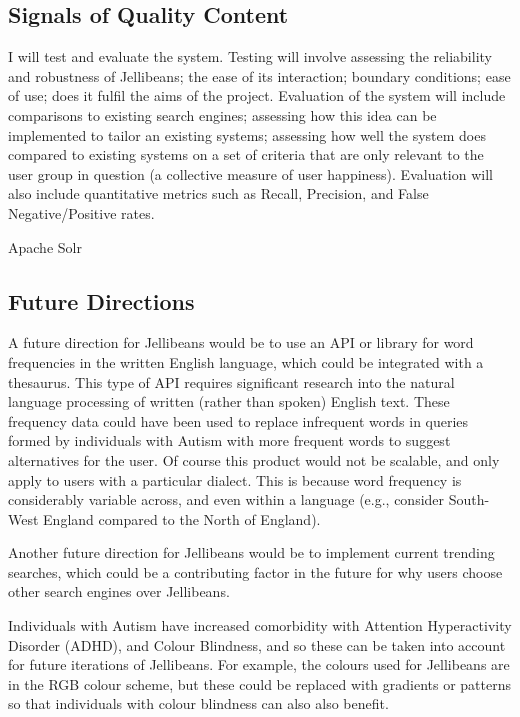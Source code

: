 \documentclass[a4paper, 11pt]{article}
\begin{document}
\subsection{Signals of Quality Content}
I will test and evaluate the system. Testing will involve assessing the reliability and robustness of Jellibeans; the ease of its interaction; boundary conditions; ease of use; does it fulfil the aims of the project.
Evaluation of the system will include comparisons to existing search engines; assessing how this idea can be implemented to tailor an existing systems; assessing how well the system does compared to existing systems on a set of criteria that are only relevant to the user group in question (a collective measure of user happiness). Evaluation will also include quantitative metrics such as Recall, Precision, and False Negative/Positive rates.


Apache Solr\\


\subsection{Future Directions}
A future direction for Jellibeans would be to use an API or library for word frequencies in the written English language, which could be integrated with a thesaurus. This type of API requires significant research into the natural language processing of written (rather than spoken) English text. These frequency data could have been used to replace infrequent words in queries formed by individuals with Autism with more frequent words to suggest alternatives for the user. Of course this product would not be scalable, and only apply to users with a particular dialect. This is because word frequency is considerably variable across, and even within a language (e.g., consider South-West England compared to the North of England).

\vspace{5mm}
Another future direction for Jellibeans would be to implement current trending searches, which could be a contributing factor in the future for why users choose other search engines over Jellibeans. 

\vspace{5mm}
Individuals with Autism have increased comorbidity with Attention Hyperactivity Disorder (ADHD), and Colour Blindness, and so these can be taken into account for future iterations of Jellibeans. For example, the colours used for Jellibeans are in the RGB colour scheme, but these could be replaced with gradients or patterns so that individuals with colour blindness can also also benefit.
\end{document}
